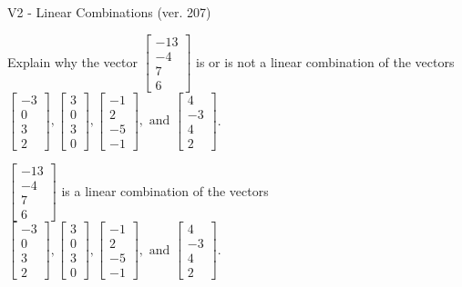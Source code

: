 \begin{exercise}
  \begin{exerciseTitle}V2 - Linear Combinations (ver. 207)\end{exerciseTitle}
  \begin{exerciseStatement}
    Explain why the vector \(\left[\begin{array}{c}
-13 \\
-4 \\
7 \\
6
\end{array}\right]\)  is or is not a linear 
	combination of the vectors \(\left[\begin{array}{c}
-3 \\
0 \\
3 \\
2
\end{array}\right] , \left[\begin{array}{c}
3 \\
0 \\
3 \\
0
\end{array}\right] , \left[\begin{array}{c}
-1 \\
2 \\
-5 \\
-1
\end{array}\right] , \text{ and } \left[\begin{array}{c}
4 \\
-3 \\
4 \\
2
\end{array}\right]\).
	


  \end{exerciseStatement}
  \begin{exerciseAnswer}
   \(\left[\begin{array}{c}
-13 \\
-4 \\
7 \\
6
\end{array}\right]\) 
  	 is  
	a linear combination of the vectors \(\left[\begin{array}{c}
-3 \\
0 \\
3 \\
2
\end{array}\right] , \left[\begin{array}{c}
3 \\
0 \\
3 \\
0
\end{array}\right] , \left[\begin{array}{c}
-1 \\
2 \\
-5 \\
-1
\end{array}\right] , \text{ and } \left[\begin{array}{c}
4 \\
-3 \\
4 \\
2
\end{array}\right]\).


\end{exerciseAnswer}
\end{exercise}
